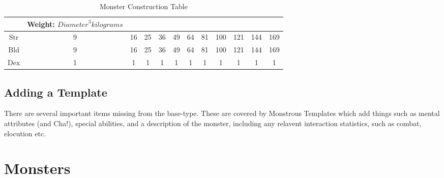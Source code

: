 \documentclass[twoside]{book}
\begin{document}
\begin{table}[htb]
\begin{center}
\begin{tabular}{|c|c|c|c|c|c|c|c|c|c|c|c|}
\hline

& Weight: \begin{math}  
                        {Diameter}^{ 3 }  kilograms  \end{math}  
                  \\

\hline

 Str & 9 & 16 & 25 & 36 & 49 & 64 & 81 & 100 & 121 & 144 & 169 \\

\hline

 Bld & 9 & 16 & 25 & 36 & 49 & 64 & 81 & 100 & 121 & 144 & 169 \\

\hline

 Dex & 1 & 1 & 1 & 1 & 1 & 1 & 1 & 1 & 1 & 1 & 1 \\

\hline


  \end{tabular}
  
\caption{Monster Construction Table}
  
  \end{center}
\end{table}
  
    

\subsection{Adding a Template}
    
    {  
    There are several important items missing from the
               base-type. These are covered by Monstrous Templates which
               add things such as mental attributes (and Cha!), special
               abilities, and a description of the monster, including any
               relavent interaction statistics, such as combat, elocution
               etc. 
    }
  
    

\section{Monsters}
    
\end{document}
